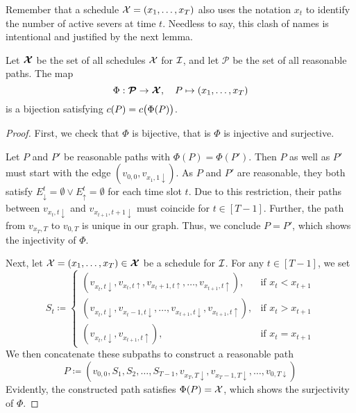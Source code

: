Remember that a schedule $\mathcal{X}=(x_1,\dotsc,x_T)$ also uses the notation $x_t$ to identify the number of active severs at time $t$. Needless to say, this clash of names is intentional and justified by the next lemma.
\begin{lem}\label{lem:sched_reasn_path_pseudo_lin}
Let $\bm{\mathcal{X}}$ be the set of all schedules $\mathcal{X}$ for $\mathcal{I}$, and let $\bm{\mathcal{P}}$ be the set of all reasonable paths. The map
\begin{equation*}
	\Phi:\bm{\mathcal{P}}\rightarrow\bm{\mathcal{X}},\quad P\mapsto (x_1,\dotsc,x_T)
\end{equation*}
is a bijection satisfying $c(P)=c\bigl(\Phi(P)\bigr)$.
\end{lem}
\begin{proof}
First, we check that $\Phi$ is bijective, that is $\Phi$ is injective and surjective. 

Let $P$ and $P'$ be reasonable paths with $\Phi(P)=\Phi(P')$. Then $P$ as well as $P'$ must start with the edge $(v_{0,0},v_{x_1,1\downarrow})$. As $P$ and $P'$ are reasonable, they both satisfy $E_\downarrow^t=\emptyset \lor E_\uparrow^t=\emptyset$ for each time slot $t$. Due to this restriction, their paths between $v_{x_t,t\downarrow}$ and $v_{x_{t+1},t+1\downarrow}$ must coincide for $t\in[T-1]$. Further, the path from $v_{x_T,T}$ to $v_{0,T}$ is unique in our graph. Thus, we conclude $P=P'$, which shows the injectivity of $\Phi$.

Next, let $\mathcal{X}=(x_1,\dotsc,x_T)\in\bm{\mathcal{X}}$ be a schedule for $\mathcal{I}$. For any $t\in[T-1]$, we set
\begin{equation*}
	S_t\coloneqq
	\begin{cases}
		(v_{x_t,t\downarrow},v_{x_t,t\uparrow},v_{x_t+1,t\uparrow},\dotsc,v_{x_{t+1},t\uparrow}), & \text{if $x_t<x_{t+1}$}\\
		(v_{x_t,t\downarrow},v_{x_t-1,t\downarrow},\dotsc,v_{x_{t+1},t\downarrow},v_{x_{t+1},t\uparrow}), & \text{if $x_t>x_{t+1}$}\\
		(v_{x_t,t\downarrow},v_{x_{t+1},t\uparrow}), & \text{if $x_t=x_{t+1}$}
	\end{cases}
\end{equation*}
We then concatenate these subpaths to construct a reasonable path
\begin{equation*}
	P\coloneqq(v_{0,0},S_1,S_2,\dotsc,S_{T-1},v_{x_T,T\downarrow},v_{x_T-1,T\downarrow},\dotsc,v_{0,T\downarrow})
\end{equation*}
Evidently, the constructed path satisfies $\Phi(P)=\mathcal{X}$, which shows the surjectivity of $\Phi$.


\end{proof}
